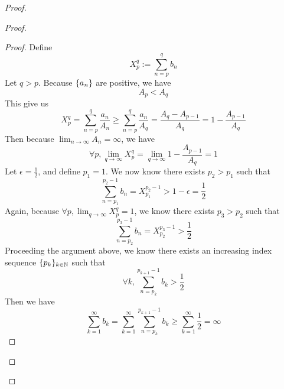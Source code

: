 \documentclass{report}
\begin{document}
\begin{proof}
\begin{proof}
\begin{proof}
Define
\begin{equation}
X^q_p:=\sum_{n=p}^q b_n
\end{equation}
Let $q>p$. Because  $\{ a_n \}$ are positive, we have 
\begin{equation}
A_p<A_q
\end{equation}
This give us
\begin{equation}
X_p^q=\sum_{n=p}^q \frac{a_n}{A_n}\geq \sum_{n=p}^q \frac{a_n}{A_q}=\frac{A_q-A_{p-1}}{A_q}=1-\frac{A_{p-1}}{A_q}
\end{equation}
Then because $\lim_{n\to\infty}A_n=\infty$, we have
\begin{equation}
\forall p,\lim_{q\to\infty}X_p^q=\lim_{q\to\infty}1-\frac{A_{p-1}}{A_q}=1
\end{equation}
Let $\epsilon =\frac{1}{2}$, and define $p_1=1$. We now know there exists $p_2>p_1$ such that
\begin{equation}
\sum_{n=p_1}^{p_2-1} b_n= X_{p_1}^{p_2-1}>1-\epsilon =\frac{1}{2}
\end{equation}
Again, because $\forall p,\lim_{q\to\infty}X_p^q=1$, we know there exists $p_3>p_2$ such that
 \begin{equation}
\sum_{n=p_2}^{p_3-1} b_n=X_{p_2}^{p_3-1} >\frac{1}{2}
\end{equation}
Proceeding the argument above, we know there exists an increasing index sequence $\{ p_k \}_{k\in\mathbb{N}}$ such that 
\begin{equation}
\forall k,\sum_{n=p_k}^{p_{k+1}-1} b_k>\frac{1}{2}
\end{equation}
Then we have
\begin{equation}
\sum_{k=1}^\infty b_k=  \sum_{k=1}^\infty \sum_{n=p_k}^{p_{k+1}-1} b_k\geq \sum_{k=1}^\infty \frac{1}{2}=\infty
\end{equation}

\end{proof}


\end{proof}
\end{proof}
\end{document}
